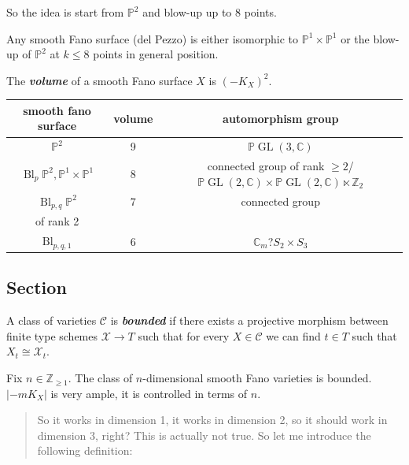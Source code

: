 So the idea is start from $\mathbb{P}^{2}$ and blow-up up to 8 points.

\begin{thm}
	Any smooth Fano surface (del Pezzo) is either isomorphic to $\mathbb{P}^{1} \times \mathbb{P}^{1}$ or the blow-up of $\mathbb{P}^{2}$ at $k\leq 8$ points in general position.
\end{thm}

\begin{defn}
	The \textit{\textbf{volume}} of a smooth Fano surface  $X$ is $(-K_{X})^{2}$.
\end{defn}

\begin{tabular}{ccc}
	smooth fano surface&volume&automorphism group\\\hline
	$\mathbb{P}^{2}$ &9& $\mathbb{P}\operatorname{GL}(3,\mathbb{C})$\\\hline
	$\operatorname{Bl}_{p}\mathbb{P}^{2}, \mathbb{P}^{1} \times \mathbb{P}^{1}$ &8&connected group of rank $\geq 2$/$\mathbb{P}\operatorname{GL}(2,\mathbb{C})\times \mathbb{P}\operatorname{GL}(2,\mathbb{C})\ltimes \mathbb{Z}_{2}$ \\\hline
	$\operatorname{Bl}_{p,q}\mathbb{P}^{2}$ &7&connected group\\ of rank 2\\\hline
	$\operatorname{Bl}_{p,q,1}$ &6&$\mathbb{C}_{m}${\color{magenta}?}$ S_{2}\times S_{3}$
\end{tabular}

\subsection{Section}
\begin{defn}
	A class of varieties $\mathcal{C}$ is \textit{\textbf{bounded}} if there exists a projective morphism between finite type schemes $\mathcal{X}\to T$ such that for every $X\in \mathcal{C}$ we can find $t\in T$ such that $X_{t}\cong \mathcal{X}_{t}$.
\end{defn}

\begin{thm}
	Fix $n \in \mathbb{Z}_{\geq 1}$. The class of $n$-dimensional smooth Fano varieties is bounded. $|-mK_{X}|$ is very ample, it is controlled in terms of $n$.
\end{thm}

\begin{quotation}
	So it works in dimension 1, it works in dimension 2, so it should work in dimension 3, right? This is actually not true. So let me introduce the following definition:
\end{quotation}

